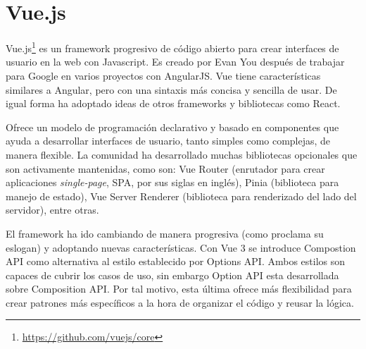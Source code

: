 \section{Vue.js}

Vue.js\footnote{\url{https://github.com/vuejs/core}} es un framework progresivo de código abierto para crear interfaces de usuario en la web con Javascript. Es creado por Evan You después de trabajar para Google en varios proyectos con AngularJS. Vue tiene características similares a Angular, pero con una sintaxis más concisa y sencilla de usar. De igual forma ha adoptado ideas de otros frameworks y bibliotecas como React.

Ofrece un modelo de programación declarativo y basado en componentes que ayuda a desarrollar interfaces de usuario, tanto simples como complejas, de manera flexible. La comunidad ha desarrollado muchas bibliotecas opcionales que son activamente mantenidas, como son: Vue Router (enrutador para crear aplicaciones \textit{single-page}, SPA, por sus siglas en inglés), Pinia (biblioteca para manejo de estado), Vue Server Renderer (biblioteca para renderizado del lado del servidor), entre otras.

El framework ha ido cambiando de manera progresiva (como proclama su eslogan) y adoptando nuevas características. Con Vue 3 se introduce Compostion API como alternativa al estilo establecido por Options API. Ambos estilos son capaces de cubrir los casos de uso, sin embargo Option API esta desarrollada sobre Composition API. Por tal motivo, esta última ofrece más flexibilidad para crear patrones más específicos a la hora de organizar el código y reusar la lógica.

